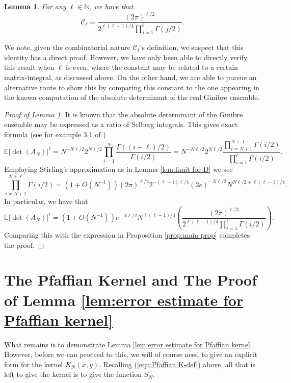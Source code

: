 \documentclass[12pt]{article}
\newcommand{\N}{\mathbb{N}}
\newcommand{\E}{\mathbb{E}}
\newtheorem{lem}[info]{Lemma}
\numberwithin{info}{section}
\numberwithin{equation}{section}
\renewcommand{\[}{\begin{equation}}
\renewcommand{\]}{\end{equation}}
\renewcommand{\cal}{\mathcal}
\newcommand{\<}{\langle}
\renewcommand{\>}{\rangle}
\begin{document}
	\begin{lem}
		\label{lem:identification of constant}
		For any $\ell\in \N$, we have that
		\[\cal{C}_{\ell}=\frac{(2\pi)^{\ell/2}}{2^{\ell(\ell-1)/4}\prod_{j=1}^{\ell}\Gamma(j/2)}.\]
	\end{lem}
	
	We note, given the combinatorial nature $\cal{C}_{\ell}$'s definition, we suspect that this identity has a direct proof. However, we have only been able to directly verify this result when $\ell$ is even, where the constant may be related to a certain matrix-integral, as discussed above. On the other hand, we are able to pursue an alternative route to show this by comparing this constant to the one appearing in the known computation of the absolute determinant of the real Ginibre ensemble. 
	
	\begin{proof}[Proof of Lemma \ref{lem:identification of constant}]
		
		It is known that the absolute determinant of the Ginibre ensemble may be expressed as a ratio of Selberg integrals. This gives exact formula (see for example 3.1 of \cite{detginibre})
		\[\E|\det(A_N)|^\ell=N^{-N\ell/2}2^{N\ell/2}\prod_{i=1}^{N}\frac{\Gamma((i+\ell)/2)}{\Gamma(i/2)}=N^{-N\ell/2}2^{N\ell/2}\frac{\prod_{i=N+1}^{N+\ell}\Gamma(i/2)}{\prod_{i=1}^{\ell}\Gamma(i/2)}.\label{eqn:determinant of ginibre ratio}\]
		Employing Stirling's approximation as in Lemma \ref{lem:limit for D} we see
		\[\prod_{i=N+1}^{N+\ell}\Gamma(i/2)=\left(1+O(N^{-1})\right)(2\pi)^{\ell/2}2^{-(\ell-1)\ell/4}(2e)^{-N\ell/2}N^{N\ell/2+\ell(\ell-1)/4}.\]
		In particular, we have that
		\[\E|\det(A_N)|^\ell=\left(1+O(N^{-1})\right)e^{-N\ell/2}N^{\ell(\ell-1)/4}\left(\frac{(2\pi)^{\ell/2}}{2^{\ell(\ell-1)/4}\prod_{i=1}^{\ell}\Gamma(i/2)}\right).\]
		Comparing this with the expression in Proposition \ref{prop:main prop} completes the proof.
	\end{proof}
	
	\section{The Pfaffian Kernel and The Proof of Lemma \ref{lem:error estimate for Pfaffian kernel} \label{section:pfaffian kernel}}
	
	What remains is to demonstrate Lemma \ref{lem:error estimate for Pfaffian kernel}. However, before we can proceed to this, we will of course need to give an explicit form for the kernel $K_N(x,y)$. Recalling (\ref{eqn:Pfaffian K-def}) above, all that is left to give the kernel is to give the function $S_N$. 
	
\end{document}
